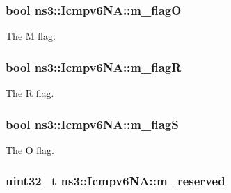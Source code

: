 \subsubsection[{\texorpdfstring{m\+\_\+flagO}{m_flagO}}]{\setlength{\rightskip}{0pt plus 5cm}bool ns3\+::\+Icmpv6\+N\+A\+::m\+\_\+flagO\hspace{0.3cm}{\ttfamily [private]}}\hypertarget{classns3_1_1Icmpv6NA_af69a1b4d2babd021e6d6121cea6ea853}{}\label{classns3_1_1Icmpv6NA_af69a1b4d2babd021e6d6121cea6ea853}


The M flag. 

\subsubsection[{\texorpdfstring{m\+\_\+flagR}{m_flagR}}]{\setlength{\rightskip}{0pt plus 5cm}bool ns3\+::\+Icmpv6\+N\+A\+::m\+\_\+flagR\hspace{0.3cm}{\ttfamily [private]}}\hypertarget{classns3_1_1Icmpv6NA_aba3ddf05ea11b9194bb0484299b91641}{}\label{classns3_1_1Icmpv6NA_aba3ddf05ea11b9194bb0484299b91641}


The R flag. 

\subsubsection[{\texorpdfstring{m\+\_\+flagS}{m_flagS}}]{\setlength{\rightskip}{0pt plus 5cm}bool ns3\+::\+Icmpv6\+N\+A\+::m\+\_\+flagS\hspace{0.3cm}{\ttfamily [private]}}\hypertarget{classns3_1_1Icmpv6NA_a1d117fa8aa4cb770bfc887bbf06e1b43}{}\label{classns3_1_1Icmpv6NA_a1d117fa8aa4cb770bfc887bbf06e1b43}


The O flag. 

\subsubsection[{\texorpdfstring{m\+\_\+reserved}{m_reserved}}]{\setlength{\rightskip}{0pt plus 5cm}uint32\+\_\+t ns3\+::\+Icmpv6\+N\+A\+::m\+\_\+reserved\hspace{0.3cm}{\ttfamily [private]}}\hypertarget{classns3_1_1Icmpv6NA_a2ae5c4f93f08343b1bd1bf12879ad39b}{}\label{classns3_1_1Icmpv6NA_a2ae5c4f93f08343b1bd1bf12879ad39b}


